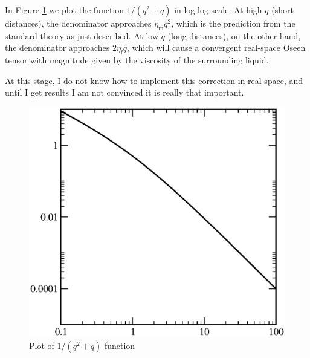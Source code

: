 In Figure \ref{fig:SD} we plot the function $1/(q^2+q)$ in log-log
scale.  At high $q$ (short distances), the denominator approaches
\( \eta_\mathrm{m} q^2 \),
which is the prediction from the standard theory as just described. At
low $q$ (long distances), on the other hand, the denominator
approaches \( 2 \eta_\mathrm{f} q \),
which will cause a convergent real-space Oseen tensor with magnitude
given by the viscosity of the surrounding liquid.

At this stage, I do not know how to implement this correction in real
space, and until I get results I am not convinced it is really that
important.

\begin{figure}
  \centering
  \begin{minipage}{0.45\textwidth}
      \includegraphics[width=\textwidth]{figures/SD}
  \end{minipage}
  \caption{Plot of $1/(q^2+q)$ function
    \label{fig:SD}}
\end{figure}

